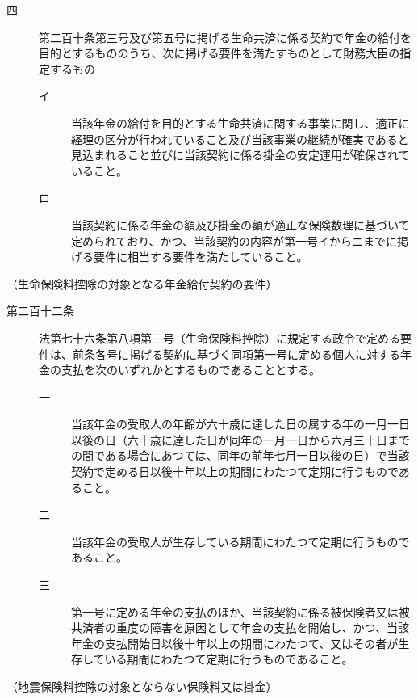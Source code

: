 \documentclass[twocolumn,a4j,10pt]{ltjtarticle}
\begin{document}
\begin{description}
\begin{description}
\item[四]第二百十条第三号及び第五号に掲げる生命共済に係る契約で年金の給付を目的とするもののうち、次に掲げる要件を満たすものとして財務大臣の指定するもの
\begin{description}
\item[イ]当該年金の給付を目的とする生命共済に関する事業に関し、適正に経理の区分が行われていること及び当該事業の継続が確実であると見込まれること並びに当該契約に係る掛金の安定運用が確保されていること。
\item[ロ]当該契約に係る年金の額及び掛金の額が適正な保険数理に基づいて定められており、かつ、当該契約の内容が第一号イからニまでに掲げる要件に相当する要件を満たしていること。
\end{description}
\end{description}
\end{description}
\noindent\hspace{10pt}（生命保険料控除の対象となる年金給付契約の要件）
\begin{description}
\item[第二百十二条]法第七十六条第八項第三号（生命保険料控除）に規定する政令で定める要件は、前条各号に掲げる契約に基づく同項第一号に定める個人に対する年金の支払を次のいずれかとするものであることとする。
\begin{description}
\item[一]当該年金の受取人の年齢が六十歳に達した日の属する年の一月一日以後の日（六十歳に達した日が同年の一月一日から六月三十日までの間である場合にあつては、同年の前年七月一日以後の日）で当該契約で定める日以後十年以上の期間にわたつて定期に行うものであること。
\item[二]当該年金の受取人が生存している期間にわたつて定期に行うものであること。
\item[三]第一号に定める年金の支払のほか、当該契約に係る被保険者又は被共済者の重度の障害を原因として年金の支払を開始し、かつ、当該年金の支払開始日以後十年以上の期間にわたつて、又はその者が生存している期間にわたつて定期に行うものであること。
\end{description}
\end{description}
\noindent\hspace{10pt}（地震保険料控除の対象とならない保険料又は掛金）
\end{document}
